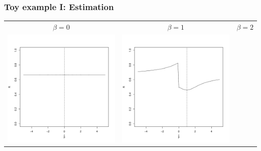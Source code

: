 \documentclass{beamer}
\begin{document}
\begin{frame}
\frametitle{Toy example I: Estimation}
\begin{center}
\begin{tabular}{ccc}
$\beta = 0$ &
$\beta = 1$ &
$\beta = 2$ \\
\includegraphics[scale = .2]{risk_0.pdf} &
\includegraphics[scale = .2]{risk_1.pdf} & 

\end{tabular}
\end{center}
\end{frame}
\end{document}
